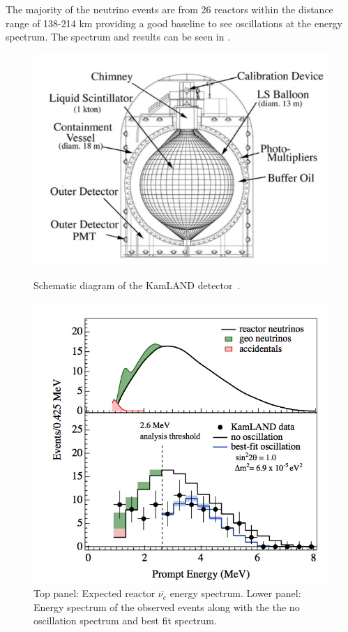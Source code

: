 The majority of the neutrino events are from 26 reactors within the distance range of 138-214 km providing a good baseline to see oscillations at the energy spectrum. The spectrum and results can be seen in . 

\begin{figure}[h!]
  \centering
  \begin{minipage}[b]{0.49\textwidth}
    \includegraphics[width=\textwidth]{figures/KamLAND.jpeg}
    \vspace{2mm}
    \caption{Schematic diagram of the KamLAND detector~\cite{46KamLAND}.}
    \label{fig:KamLAND}
  \end{minipage}
  \hfill
  \begin{minipage}[b]{0.49\textwidth}
    \includegraphics[width=\textwidth]{figures/KamLAND2.jpeg}
       \vspace{2mm}
    \caption{Top panel: Expected reactor $\bar{\nu_e}$ energy spectrum. Lower panel: Energy spectrum of the observed events along with the the no oscillation spectrum and best fit spectrum. }
     \label{fig:KamLAND2}
  \end{minipage}
\end{figure}

